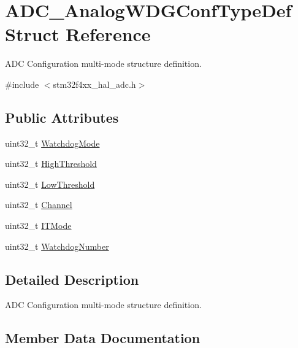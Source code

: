 \hypertarget{struct_a_d_c___analog_w_d_g_conf_type_def}{}\section{A\+D\+C\+\_\+\+Analog\+W\+D\+G\+Conf\+Type\+Def Struct Reference}
\label{struct_a_d_c___analog_w_d_g_conf_type_def}


A\+DC Configuration multi-\/mode structure definition.  




{\ttfamily \#include $<$stm32f4xx\+\_\+hal\+\_\+adc.\+h$>$}

\subsection*{Public Attributes}
\begin{DoxyCompactItemize}
\item 
uint32\+\_\+t \hyperlink{struct_a_d_c___analog_w_d_g_conf_type_def_ad4c60783321a30e8edffa323148e424d}{Watchdog\+Mode}
\item 
uint32\+\_\+t \hyperlink{struct_a_d_c___analog_w_d_g_conf_type_def_a9bee62b3d364713a16a15cefcc217e65}{High\+Threshold}
\item 
uint32\+\_\+t \hyperlink{struct_a_d_c___analog_w_d_g_conf_type_def_a77e1743ebd27333ac2c9de55a25cd4c8}{Low\+Threshold}
\item 
uint32\+\_\+t \hyperlink{struct_a_d_c___analog_w_d_g_conf_type_def_abc86b5861e3eff802fe765e62054f348}{Channel}
\item 
uint32\+\_\+t \hyperlink{struct_a_d_c___analog_w_d_g_conf_type_def_ab67703b11dbb0303fb5b56bd328ef06d}{I\+T\+Mode}
\item 
uint32\+\_\+t \hyperlink{struct_a_d_c___analog_w_d_g_conf_type_def_a025e81af21b93c5b8daf9f5241383302}{Watchdog\+Number}
\end{DoxyCompactItemize}


\subsection{Detailed Description}
A\+DC Configuration multi-\/mode structure definition. 

\subsection{Member Data Documentation}

